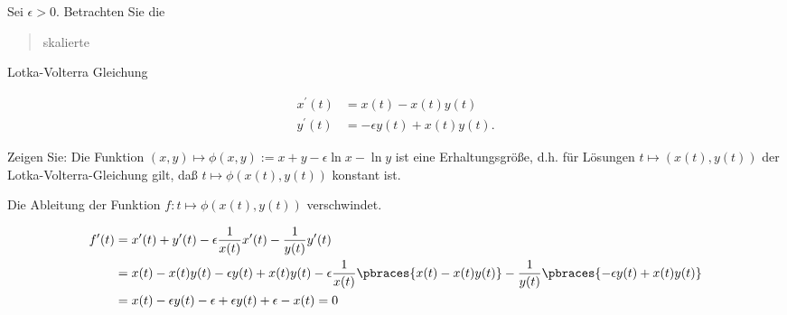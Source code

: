 \begin{exercise}

Sei $\epsilon > 0$. Betrachten Sie die \blockquote{skalierte} Lotka-Volterra Gleichung

\begin{align*}
  x^\prime(t) & = x(t) - x(t) y(t) \\
  y^\prime(t) & = -\epsilon y(t) + x(t) y(t).
\end{align*}

Zeigen Sie: Die Funktion $(x, y) \mapsto \phi(x, y) := x + y - \epsilon \ln{x} - \ln{y}$ ist eine Erhaltungsgröße, d.h. für Lösungen $t \mapsto (x(t), y(t))$ der Lotka-Volterra-Gleichung gilt, daß $t \mapsto \phi(x(t), y(t))$ konstant ist.

\end{exercise}

\begin{solution}

Die Ableitung der Funktion $f: t \mapsto \phi(x(t), y(t))$ verschwindet.

\begin{align*}
  f^\prime(t)
  & =
  x^\prime(t) +
  y^\prime(t) -
  \epsilon
  \frac{1}{x(t)} x^\prime(t) -
  \frac{1}{y(t)} y^\prime(t) \\
  & =
  x(t) - x(t) y(t) -
  \epsilon
  y(t) + x(t) y(t) -
  \epsilon
  \frac{1}{x(t)}
  \pbraces
  {
    x(t) - x(t) y(t)
  } -
  \frac{1}{y(t)}
  \pbraces
  {
    -\epsilon
    y(t) + x(t) y(t)
  } \\
  & =
  x(t) - \epsilon y(t) - \epsilon + \epsilon y(t) + \epsilon - x(t) = 0
\end{align*}

\end{solution}
